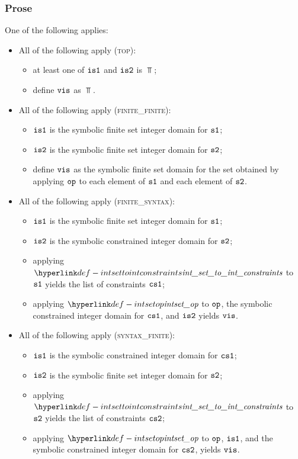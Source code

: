 \subsubsection{Prose}
One of the following applies:
\begin{itemize}
  \item All of the following apply (\textsc{top}):
  \begin{itemize}
    \item at least one of $\texttt{is1}$ and $\texttt{is2}$ is $\Top$;
    \item define $\texttt{vis}$ as $\Top$.
  \end{itemize}

  \item All of the following apply (\textsc{finite\_finite}):
  \begin{itemize}
    \item $\texttt{is1}$ is the symbolic finite set integer domain for $\texttt{s1}$;
    \item $\texttt{is2}$ is the symbolic finite set integer domain for $\texttt{s2}$;
    \item define $\texttt{vis}$ as the symbolic finite set domain for the set obtained
          by applying $\texttt{op}$ to each element of $\texttt{s1}$ and each element of $\texttt{s2}$.
  \end{itemize}

  \item All of the following apply (\textsc{finite\_syntax}):
  \begin{itemize}
    \item $\texttt{is1}$ is the symbolic finite set integer domain for $\texttt{s1}$;
    \item $\texttt{is2}$ is the symbolic constrained integer domain for $\texttt{s2}$;
    \item applying $\intsettointconstraints$ to $\texttt{s1}$ yields the list of constraints $\texttt{cs1}$;
    \item applying $\intsetop$ to $\texttt{op}$, the symbolic constrained integer domain for $\texttt{cs1}$,
          and $\texttt{is2}$ yields $\texttt{vis}$.
  \end{itemize}

  \item All of the following apply (\textsc{syntax\_finite}):
  \begin{itemize}
    \item $\texttt{is1}$ is the symbolic constrained integer domain for $\texttt{cs1}$;
    \item $\texttt{is2}$ is the symbolic finite set integer domain for $\texttt{s2}$;
    \item applying $\intsettointconstraints$ to $\texttt{s2}$ yields the list of constraints $\texttt{cs2}$;
    \item applying $\intsetop$ to $\texttt{op}$, $\texttt{is1}$, and the symbolic constrained integer domain
          for $\texttt{cs2}$, yields $\texttt{vis}$.
  \end{itemize}


\end{itemize}

